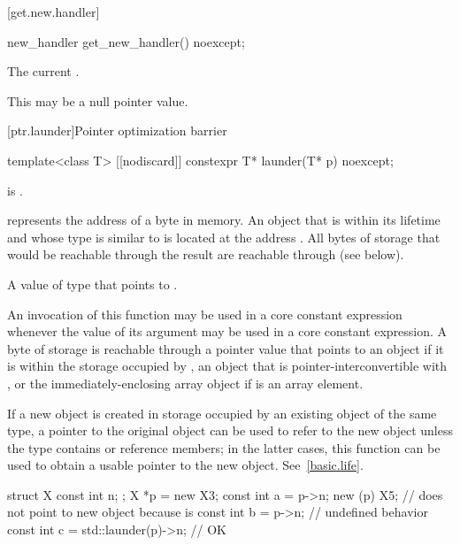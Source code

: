 [get.new.handler]{}

%
\begin{itemdecl}
new_handler get_new_handler() noexcept;
\end{itemdecl}

\begin{itemdescr}
\pnum
\returns The current .
\begin{note} This may be a null pointer value. \end{note}
\end{itemdescr}

[ptr.launder]{Pointer optimization barrier}

%
\begin{itemdecl}
template<class T> [[nodiscard]] constexpr T* launder(T* p) noexcept;
\end{itemdecl}

\begin{itemdescr}
\pnum
\mandates
{} is .

\pnum
\expects
{} represents the address  of a byte in memory.
An object  that is within its lifetime
and whose type is similar to 
is located at the address .
All bytes of storage that would be reachable through the result
are reachable through  (see below).

\pnum
\returns
A value of type  that points to .

\pnum
\remarks
An invocation of this function
may be used in a core constant expression
whenever the value of its argument
may be used in a core constant expression.
A byte of storage is
reachable through a pointer value
that points to an object 
if it is within the storage occupied by
,
an object that is pointer-interconvertible with , or
the immediately-enclosing array object if  is an array element.

\pnum
\begin{note}
If a new object is created
in storage occupied by an existing object of the same type,
a pointer to the original object
can be used to refer to the new object
unless the type contains  or reference members;
in the latter cases,
this function can be used to obtain a usable pointer to the new object.
See~\ref{basic.life}.
\end{note}

\pnum
\begin{example}
\begin{codeblock}
struct X { const int n; };
X *p = new X{3};
const int a = p->n;
new (p) X{5};                       //  does not point to new object because  is 
const int b = p->n;                 // undefined behavior
const int c = std::launder(p)->n;   // OK
\end{codeblock}
\end{example}
\end{itemdescr}

